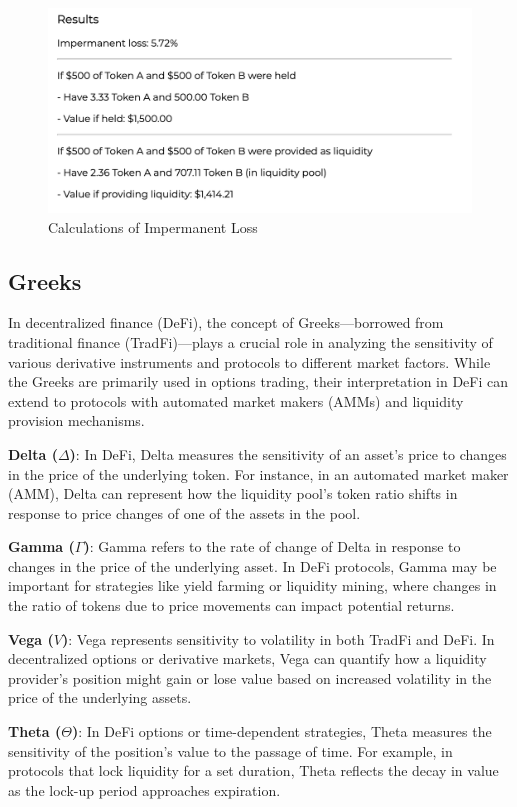 \documentclass[12pt]{article}
\begin{document}
\begin{figure}[H]
    \centering
    \includegraphics[width=0.6\linewidth]{results.png}
    \caption{Calculations of Impermanent Loss}
    \label{fig:calculations}
\end{figure}

\subsection{Greeks}\label{subsec:greeks}
In decentralized finance (DeFi), the concept of Greeks—borrowed from traditional finance (TradFi)—plays a crucial role in analyzing the sensitivity of various derivative instruments and protocols to different market factors. While the Greeks are primarily used in options trading, their interpretation in DeFi can extend to protocols with automated market makers (AMMs) and liquidity provision mechanisms.

\textbf{Delta (\(\Delta\))}: In DeFi, Delta measures the sensitivity of an asset's price to changes in the price of the underlying token. For instance, in an automated market maker (AMM), Delta can represent how the liquidity pool's token ratio shifts in response to price changes of one of the assets in the pool.

\textbf{Gamma (\(\Gamma\))}: Gamma refers to the rate of change of Delta in response to changes in the price of the underlying asset. In DeFi protocols, Gamma may be important for strategies like yield farming or liquidity mining, where changes in the ratio of tokens due to price movements can impact potential returns.

\textbf{Vega (\(V\))}: Vega represents sensitivity to volatility in both TradFi and DeFi. In decentralized options or derivative markets, Vega can quantify how a liquidity provider’s position might gain or lose value based on increased volatility in the price of the underlying assets.

\textbf{Theta (\(\Theta\))}: In DeFi options or time-dependent strategies, Theta measures the sensitivity of the position's value to the passage of time. For example, in protocols that lock liquidity for a set duration, Theta reflects the decay in value as the lock-up period approaches expiration.
\end{document}
